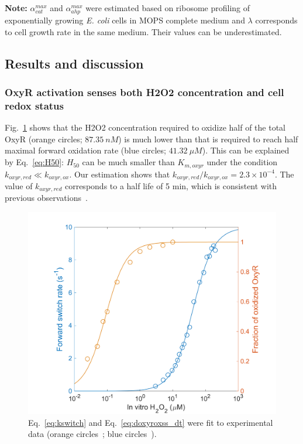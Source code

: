 \documentclass[10pt]{article}
\begin{document}
\noindent\textbf{Note:} $\alpha_{cat}^{max}$ and $\alpha_{ahp}^{max}$ were estimated based on ribosome profiling of exponentially growing \textit{E. coli} cells in MOPS complete medium and $\lambda$ corresponds to cell growth rate in the same medium. Their values can be underestimated.

\subsection{Results and discussion}

\subsubsection{OxyR activation senses both H2O2 concentration and cell redox status}
\label{sect:oxyr_activation_senses_both_h2o2_concentration_and_cell_redox_status}
Fig.~\ref{fig:fit_oxyr_paras} shows that the H2O2 concentration required to oxidize half of the total OxyR (orange circles; $87.35~nM$) is much lower than that is required to reach half maximal forward oxidation rate (blue circles; $41.32~\mu M$). This can be explained by Eq.~\ref{eq:H50}: $H_{50}$ can be much smaller than $K_{m,oxyr}$ under the condition $k_{oxyr,red}\ll k_{oxyr,ox}$. Our estimation shows that $k_{oxyr,red}/k_{oxyr,ox} = 2.3\times 10^{-4}$. The value of $k_{oxyr,red}$ corresponds to a half life of 5 min, which is consistent with previous observations~\cite{aaslund1999regulation}.

\begin{figure}[H]
\centering
  \includegraphics[width=0.5\linewidth]{prediction_oxyr_kinetics_fraction.png}
  \caption{Eq.~\ref{eq:kswitch} and Eq.~\ref{eq:doxyroxss_dt} were fit to experimental data (orange circles~\cite{aaslund1999regulation}; blue circles~\cite{lee2004redox}).}
  \label{fig:fit_oxyr_paras}
\end{figure}
\end{document}
